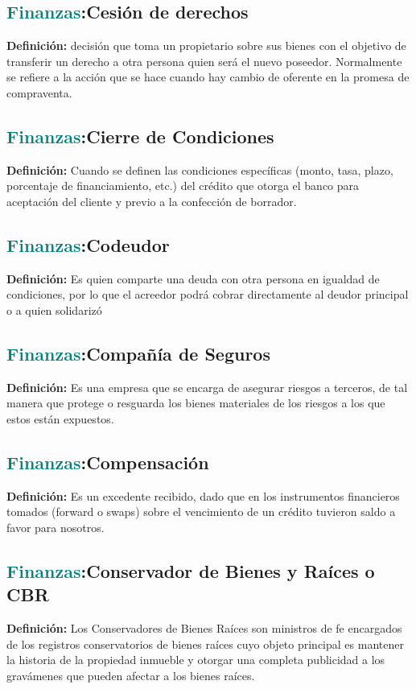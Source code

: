 \documentclass[12pt]{article}
\begin{document}
\subsection{\textcolor{teal}{Finanzas}:{Cesión de derechos}}
\textbf{Definición:} decisión que toma un propietario sobre sus bienes con el objetivo de transferir un derecho a otra persona quien será el nuevo poseedor. Normalmente se refiere a la acción que se hace cuando hay cambio de oferente en la promesa de compraventa.
\subsection{\textcolor{teal}{Finanzas}:{Cierre de Condiciones}}
\textbf{Definición:} Cuando se definen las condiciones específicas (monto, tasa, plazo, porcentaje de financiamiento, etc.) del crédito que otorga el banco para aceptación del cliente y previo a la confección de borrador.
\subsection{\textcolor{teal}{Finanzas}:{Codeudor}}
\textbf{Definición:} Es quien comparte una deuda con otra persona en igualdad de condiciones, por lo que el acreedor podrá cobrar directamente al deudor principal o a quien solidarizó
\subsection{\textcolor{teal}{Finanzas}:{Compañía de Seguros}}
\textbf{Definición:} Es una empresa que se encarga de asegurar riesgos a terceros, de tal manera que protege o resguarda los bienes materiales de los riesgos a los que estos están expuestos.
\subsection{\textcolor{teal}{Finanzas}:{Compensación}}
\textbf{Definición:} Es un excedente recibido, dado que en los instrumentos financieros tomados (forward o swaps) sobre el vencimiento de un crédito tuvieron saldo a favor para nosotros.
\subsection{\textcolor{teal}{Finanzas}:{Conservador de Bienes y Raíces o CBR}}
\textbf{Definición:} Los Conservadores de Bienes Raíces son ministros de fe encargados de los registros conservatorios de bienes raíces cuyo objeto principal es mantener la historia de la propiedad inmueble y otorgar una completa publicidad a los gravámenes que pueden afectar a los bienes raíces.
\end{document}
